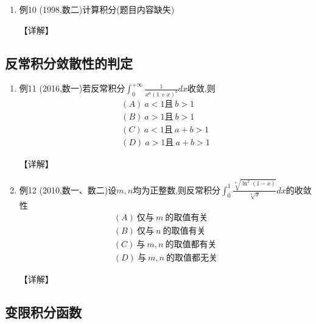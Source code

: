 \documentclass[12pt, a4paper, oneside, UTF8]{ctexbook}
\begin{document}
\begin{enumerate}[label=\arabic*.,start=9]
    \item 例10 (1998,数二)计算积分(题目内容缺失)
    
    \begin{solution}
    【详解】
    \end{solution}
\end{enumerate}

\subsection{ 反常积分敛散性的判定}

\begin{enumerate}[label=\arabic*.,start=10]
    \item 例11 (2016,数一)若反常积分$\int_0^{+\infty}\frac{1}{x^a(1+x)^b} dx$收敛,则
    \begin{align*}
        (A)\ a<1且\ b>1 \\
        (B)\ a>1且\ b>1 \\
        (C)\ a<1且\ a+b>1 \\
        (D)\ a>1且\ a+b>1
    \end{align*}
    
    \begin{solution}
    【详解】
    \end{solution}
    
    \item 例12 (2010,数一、数二)设$m,n$均为正整数,则反常积分$\int_0^1\frac{\sqrt[n]{\ln^2(1-x)}}{\sqrt[n]{x}} dx$的收敛性
    \begin{align*}
        (A)\ 仅与\ m\ 的取值有关 \\
        (B)\ 仅与\ n\ 的取值有关 \\
        (C)\ 与\ m,n\ 的取值都有关 \\
        (D)\ 与\ m,n\ 的取值都无关
    \end{align*}
    
    \begin{solution}
    【详解】
    \end{solution}
\end{enumerate}

\subsection{ 变限积分函数}
\end{document}
